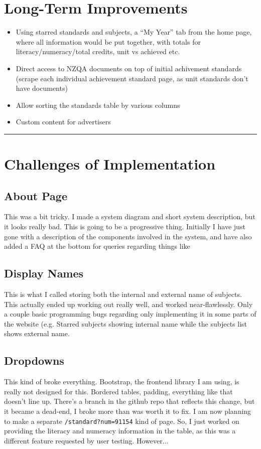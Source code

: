 \documentclass{article}
\begin{document}
\section*{Long-Term Improvements}
\begin{itemize}
    \item Using starred standards and subjects, a ``My Year'' tab from the home page, where all information would be put together, with totals for literacy/numeracy/total credits, unit vs achieved etc.
    \item Direct access to NZQA documents on top of initial achivement standards (scrape each individual achievement standard page, as unit standards don't have documents)
    \item Allow sorting the standards table by various columns
    \item Custom content for advertisers
\end{itemize}

\begin{center}
\rule{0.5\textwidth}{0.2pt}
\end{center}

\section*{Challenges of Implementation}

\subsection*{About Page}
This was a bit tricky. I made a system diagram and short system description, but it looks really bad. This is going to be a progressive thing. Initially I have just gone with a description of the components involved in the system, and have also added a FAQ at the bottom for queries regarding things like 

\subsection*{Display Names}
This is what I called storing both the internal and external name of subjects. This actually ended up working out really well, and worked near-flawlessly. Only a couple basic programming bugs regarding only implementing it in some parts of the website (e.g. Starred subjects showing internal name while the subjects list shows external name. 
\subsection*{Dropdowns}
This kind of broke everything. Bootstrap, the frontend library I am using, is really not designed for this. Bordered tables, padding, everything like that doesn't line up. There's a branch in the github repo that reflects this change, but it became a dead-end, I broke more than was worth it to fix. I am now planning to make a separate \texttt{/standard?num=91154} kind of page. So, I just worked on providing the literacy and numeracy information in the table, as this was a different feature requested by user testing. However...
\end{document}
